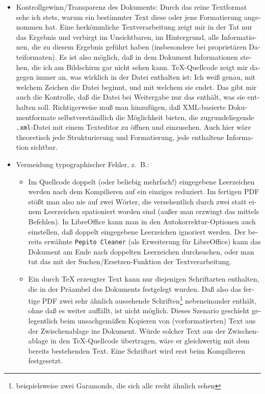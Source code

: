 \documentclass[11pt,a4paper,ngerman,french,DIV=8]{scrartcl}
\begin{document}
\begin{otherlanguage}{ngerman}
\begin{itemize}
  \item Kontrollgewinn/Transparenz des Dokuments: Durch das reine Textformat sehe ich stets, warum ein bestimmter Text diese oder jene Formatierung angenommen hat. Eine herkömmliche Textverarbeitung zeigt mir in der Tat nur das Ergebnis und verbirgt im Unsichtbaren, im Hintergrund, alle Informationen, die zu diesem Ergebnis geführt haben (insbesondere bei proprietären Dateiformaten). Es ist also möglich, daß in dem Dokument Informationen stehen, die ich am Bildschirm gar nicht sehen kann. \TeX{}-Quellcode zeigt mir dagegen immer an, was wirklich in der Datei enthalten ist: Ich weiß genau, mit welchem Zeichen die Datei beginnt, und mit welchem sie endet. Das gibt mir auch die Kontrolle, daß die Datei bei Weitergabe nur das enthält, was sie enthalten soll. Richtigerweise muß man hinzufügen, daß XML-basierte Dokumentformate selbstverständlich die Möglichkeit bieten, die zugrundeliegende \texttt{.xml}-Datei mit einem Texteditor zu öffnen und einzusehen. Auch hier wäre theoretisch jede Strukturierung und Formatierung, jede enthaltene Information sichtbar.
  \item Vermeidung typographischer Fehler, z.~B.:
  \begin{itemize}
    \item Im Quellcode doppelt (oder beliebig mehrfach!) eingegebene Leerzeichen werden nach dem Kompilieren auf ein einziges reduziert. Im fertigen PDF stößt man also nie auf zwei Wörter, die versehentlich durch zwei statt einem Leerzeichen spationiert worden sind (außer man erzwingt das mittels Befehlen). In LibreOffice kann man in den Autokorrektur-Optionen auch einstellen, daß doppelt eingegebene Leerzeichen ignoriert werden. Der bereits erwähnte \texttt{Pepito Cleaner} (als Erweiterung für LibreOffice) kann das Dokument am Ende nach doppelten Leerzeichen durchsuchen, oder man tut das mit der Suchen/Ersetzen-Funktion der Textverarbeitung.
    \item Ein durch \TeX{} erzeugter Text kann nur diejenigen Schriftarten enthalten, die in der Präambel des Dokuments festgelegt wurden. Daß also das fertige PDF zwei sehr ähnlich aussehende Schriften\footnote{beispielsweise zwei Garamonds, die sich alle recht ähnlich sehen} nebeneinander enthält, ohne daß es weiter auffällt, ist nicht möglich. Dieses Szenario geschieht gelegentlich beim unsachgemäßen Kopieren von (vorformatierten) Text aus der Zwischenablage ins Dokument. Würde solcher Text aus der Zwischenablage in den \TeX{}-Quellcode übertragen, wäre er gleichwertig mit dem bereits bestehenden Text. Eine Schriftart wird erst beim Kompilieren festgesetzt.

\end{itemize}
\end{itemize}
\end{otherlanguage}
\end{document}
